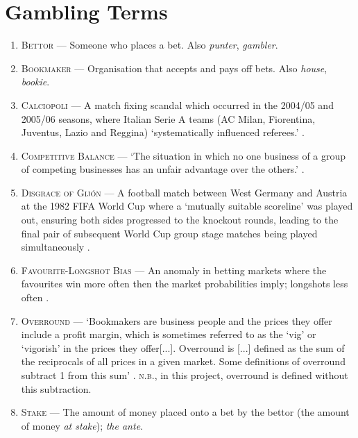 \documentclass[a4paper,10pt]{report}
\begin{document}
\section{Gambling Terms}\label{app:definitionsgambling}
\begin{enumerate}
	\item\label{def:bettor} \textsc{Bettor} --- Someone who places a bet. Also \textit{punter}, \textit{gambler}.
	\item\label{def:bookmaker}\textsc{Bookmaker} --- Organisation that accepts and pays off bets. Also \textit{house}, \textit{bookie}.
	\item \label{def:calciopoli} \textsc{Calciopoli} --- A match fixing scandal which occurred in the 2004/05 and 2005/06 seasons, where Italian Serie A teams (AC Milan, Fiorentina, Juventus, Lazio and Reggina) `systematically influenced referees.' \autocite{Calciopoli}.
	\item\label{def:compbal} \textsc{Competitive Balance} --- `The situation in which no one business of a group of competing businesses has an unfair advantage over the others.' \autocite{CompetitiveBalance}.
	\item \label{def:disgraceofgijon} \textsc{Disgrace of Gijón} --- A football match between West Germany and Austria at the 1982 FIFA World Cup where a `mutually suitable scoreline' was played out, ensuring both sides progressed to the knockout rounds, leading to the final pair of subsequent World Cup group stage matches being played simultaneously \autocite{DisgraceofGijon}.
	\item\label{def:favelongshot} \textsc{Favourite-Longshot Bias} --- An anomaly in betting markets where the favourites win more often then the market probabilities imply; longshots less often \autocite{cain00}. 
	\item \label{def:overround} \textsc{Overround} --- `Bookmakers are business people and the prices they offer include a profit margin, which is sometimes referred to as the `vig' or `vigorish' in the prices they offer[...]. Overround is [...] defined as the sum of the reciprocals of all prices in a given market. Some definitions of overround subtract 1 from this sum' \autocite{overround}. \textsc{n.b.}, in this project, overround is defined without this subtraction.
	\item \label{def:stake} \textsc{Stake} --- The amount of money placed onto a bet by the bettor (the amount of money \textit{at stake}); \textit{the ante}.
\end{enumerate}
\end{document}

